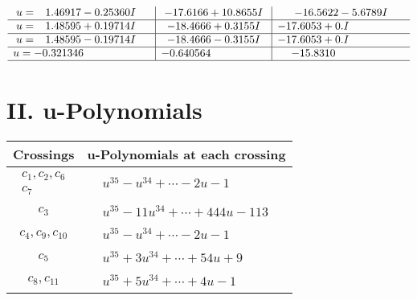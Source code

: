 \documentclass[1p]{elsarticle_modified}
\theoremstyle{definition}
\begin{document}
$$\begin{array}{c|c|c}
\begin{aligned}
u &= \phantom{-}1.46917 - 0.25360 I\end{aligned}
 & -17.6166 + 10.8655 I & -16.5622 - 5.6789 I \\ \hline\begin{aligned}
u &= \phantom{-}1.48595 + 0.19714 I\end{aligned}
 & -18.4666 + 0.3155 I & -17.6053 + 0. I\phantom{ +0.000000I} \\ \hline\begin{aligned}
u &= \phantom{-}1.48595 - 0.19714 I\end{aligned}
 & -18.4666 - 0.3155 I & -17.6053 + 0. I\phantom{ +0.000000I} \\ \hline\begin{aligned}
u &= -0.321346\phantom{ +0.000000I}\end{aligned}
 & -0.640564\phantom{ +0.000000I} & -15.8310\phantom{ +0.000000I}\\
 \hline 
 \end{array}$$\newpage
\newpage\renewcommand{\arraystretch}{1}
\centering \section*{ II. u-Polynomials}
\begin{tabular}{m{50pt}|m{274pt}}
Crossings & \hspace{64pt}u-Polynomials at each crossing \\
\hline $$\begin{aligned}c_{1},c_{2},c_{6}\\c_{7}\end{aligned}$$&$\begin{aligned}
&u^{35}- u^{34}+\cdots-2 u-1
\end{aligned}$\\
\hline $$\begin{aligned}c_{3}\end{aligned}$$&$\begin{aligned}
&u^{35}-11 u^{34}+\cdots+444 u-113
\end{aligned}$\\
\hline $$\begin{aligned}c_{4},c_{9},c_{10}\end{aligned}$$&$\begin{aligned}
&u^{35}- u^{34}+\cdots-2 u-1
\end{aligned}$\\
\hline $$\begin{aligned}c_{5}\end{aligned}$$&$\begin{aligned}
&u^{35}+3 u^{34}+\cdots+54 u+9
\end{aligned}$\\
\hline $$\begin{aligned}c_{8},c_{11}\end{aligned}$$&$\begin{aligned}
&u^{35}+5 u^{34}+\cdots+4 u-1
\end{aligned}$\\
\hline
\end{tabular}\newpage\renewcommand{\arraystretch}{1}
\end{document}
